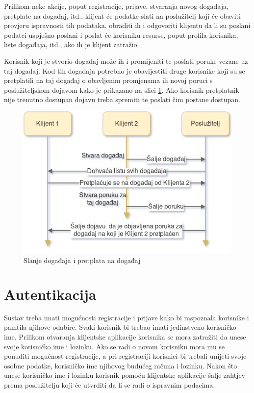 \documentclass[times, utf8, zavrsni]{fer}
\begin{document}
{Prilikom neke akcije, poput registracije, prijave, stvaranja novog događaja, pretplate na događaj, itd., klijent će podatke slati na poslužitelj koji će obaviti provjeru ispravnosti tih podataka, obraditi ih i odgovoriti klijentu da li su poslani podatci uspješno poslani i poslat će korisniku resurse, poput profila korisnika, liste događaja, itd., ako ih je klijent zatražio.

Korisnik koji je stvorio događaj može ih i promijeniti te poslati poruke vezane uz taj događaj. Kod tih događaja potrebno je obavijestiti druge korisnike koji su se pretplatili na taj događaj o obavljenim promjenama ili novoj poruci s poslužiteljskom dojavom kako je prikazano na slici \ref{fig:event-subscription-image}. Ako korisnik pretplatnik nije trenutno dostupan dojavu treba spremiti te poslati čim postane dostupan.

\begin{figure}[htb]
\centering
\includegraphics[width=12cm]{img/event-subscription.png}
\caption{Slanje događaja i pretplata na događaj}
\label{fig:event-subscription-image}
\end{figure}

\section{Autentikacija}
Sustav treba imati mogućnosti registracije i prijave kako bi raspoznala korisnike i pamtila njihove odabire. Svaki korisnik bi trebao imati jedinstveno korisničko ime. Prilikom otvaranja klijentske aplikacije korisnika se mora zatražiti da unese svoje korisničko ime i lozinku. Ako se radi o novom korisniku mora mu se ponuditi mogućnost registracije, a pri registraciji korisnici bi trebali unijeti svoje osobne podatke, korisničko ime njihovog budućeg računa i lozinku. Nakon što unese korisničko ime i lozinku korisnik pomoću klijentske aplikacije šalje zahtjev prema poslužitelju koji će utvrditi da li se radi o ispravnim podacima. 

}
\end{document}
